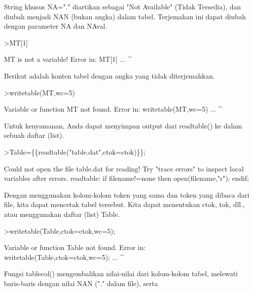 \documentclass[a4paper,10pt]{article}
\begin{document}
\begin{eulernotebook}
\begin{eulercomment}
String khusus NA="." diartikan sebagai "Not Available" (Tidak
Tersedia), dan diubah menjadi NAN (bukan angka) dalam tabel.
Terjemahan ini dapat diubah dengan parameter NA dan NAval.
\end{eulercomment}
\begin{eulerprompt}
>MT[1]
\end{eulerprompt}
\begin{euleroutput}
  MT is not a variable!
  Error in:
  MT[1] ...
       ^
\end{euleroutput}
\begin{eulercomment}
Berikut adalah konten tabel dengan angka yang tidak diterjemahkan.
\end{eulercomment}
\begin{eulerprompt}
>writetable(MT,wc=5)
\end{eulerprompt}
\begin{euleroutput}
  Variable or function MT not found.
  Error in:
  writetable(MT,wc=5) ...
               ^
\end{euleroutput}
\begin{eulercomment}
Untuk kenyamanan, Anda dapat menyimpan output dari readtable() ke
dalam sebuah daftar (list).
\end{eulercomment}
\begin{eulerprompt}
>Table=\{\{readtable("table.dat",ctok=ctok)\}\};
\end{eulerprompt}
\begin{euleroutput}
  Could not open the file
  table.dat
  for reading!
  Try "trace errors" to inspect local variables after errors.
  readtable:
      if filename!=none then open(filename,"r"); endif;
\end{euleroutput}
\begin{eulercomment}
Dengan menggunakan kolom-kolom token yang sama dan token yang dibaca
dari file, kita dapat mencetak tabel tersebut. Kita dapat menentukan
ctok, tok, dll., atau menggunakan daftar (list) Table.
\end{eulercomment}
\begin{eulerprompt}
>writetable(Table,ctok=ctok,wc=5);
\end{eulerprompt}
\begin{euleroutput}
  Variable or function Table not found.
  Error in:
  writetable(Table,ctok=ctok,wc=5); ...
                  ^
\end{euleroutput}
\begin{eulercomment}
Fungsi tablecol() mengembalikan nilai-nilai dari kolom-kolom tabel,
melewati baris-baris dengan nilai NAN ("." dalam file), serta

\end{eulercomment}
\end{eulernotebook}
\end{document}
